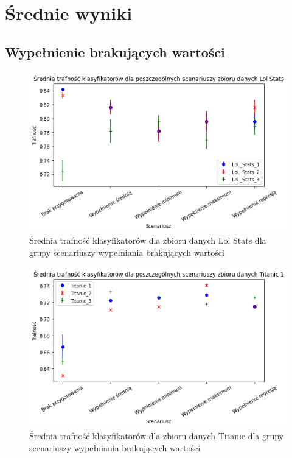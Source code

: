 \documentclass{book}
\begin{document}
\section{Średnie wyniki}

\subsection{Wypełnienie brakujących wartości}

\begin{figure}[H]
    \centerline{\includegraphics[scale=0.5]{Lol_Stats_Avg_Wypełnienie_brakujących}}
    \centering
    \caption{Średnia trafność klasyfikatorów dla zbioru danych Lol Stats 
    dla grupy scenariuszy wypełniania brakujących wartości}
    \end{figure}

\begin{figure}[H]
    \centerline{\includegraphics[scale=0.5]{Titanic_Avg_Wypełnienie_brakujących}}
    \centering
    \caption{Średnia trafność klasyfikatorów dla zbioru danych Titanic 
    dla grupy scenariuszy wypełniania brakujących wartości}
    \end{figure}
\end{document}
